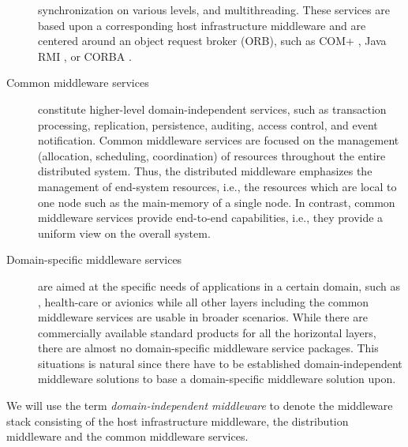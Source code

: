 \documentclass[a4paper, 10pt]{book}
\begin{document}
\begin{description}
                    synchronization on various levels, and multithreading. 
                    These services are based upon a corresponding host infrastructure
                    middleware and are centered around an object request broker (ORB),
                    such as COM+ \cite{box97}, Java RMI \cite{sun98}, or CORBA
                    \cite{omg01}. 
                \item[Common middleware services] constitute higher-level
                    domain-independent services, such as transaction processing,
                    replication, persistence, auditing, access control, and event
                    notification.  Common middleware services are focused on the
                    management (allocation, scheduling, coordination) of resources
                    throughout the entire distributed system. Thus, the distributed
                    middleware emphasizes the management of end-system resources, i.e.,
                    the resources which are local to one node such as the main-memory of
                    a single node. In contrast, common middleware services provide
                    end-to-end capabilities, i.e., they provide a uniform view on the
                    overall system. 
                \item[Domain-specific middleware services] are aimed at the
                    specific needs of applications in a certain domain, such as \MMORGS,
                    health-care or avionics while all other layers including the common
                    middleware services are usable in broader scenarios.
                    While there are commercially available standard products for all the
                    horizontal layers, there are almost no domain-specific middleware
                    service packages. This situations is natural since there have to be
                    established domain-independent middleware solutions to base
                    a domain-specific middleware solution upon.
            \end{description}
            We will use the term \emph{domain-independent middleware} to denote
            the middleware stack consisting of the host infrastructure middleware,
            the distribution middleware and the common middleware services.
\end{document}
